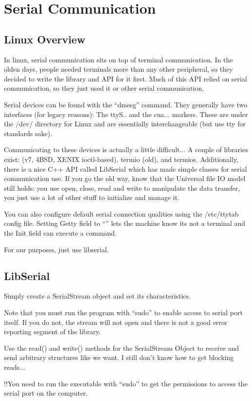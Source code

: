 \documentclass{article}
\begin{document}
\section{Serial Communication}
\subsection*{Linux Overview}
In linux, serial communication sits on top of terminal communication. In the olden days, people needed terminals more than any other peripheral, so they decided to write the library and API for it first. Much of this API relied on serial communication, so they just used it or other serial communication.

Serial devices can be found with the ``dmesg'' command. They generally have two interfaces (for legacy reasons): The ttyS.. and the cua... markers. These are under the /dev/ directory for Linux and are essentially interchangeable (but use tty for standards sake).

Communicating to these devices is actually a little difficult... A couple of libraries exist: (v7, 4BSD, XENIX ioctl-based), termio (old), and termios. Additionally, there is a nice C++ API called LibSerial which has made simple classes for serial communication use. If you go the old way, know that the Universal file IO model still holds: you use open, close, read and write to manipulate the data transfer, you just use a lot of other stuff to initialize and manage it.

You can also configure default serial connection qualities using the /etc/ttytab config file. Setting Getty field to ``'' lets the machine know its not a terminal and the Init field can execute a command.

For our purposes, just use libserial.
\subsection*{LibSerial}
Simply create a SerialStream object and set its characteristics.

Note that you must run the program with ``sudo'' to enable access to serial port itself. If you do not, the stream will not open and there is not a good error reporting segment of the library.

Use the read() and write() methods for the SerialStream Object to receive and send arbitrary structures like we want. I still don't know how to get blocking reads...

!!You need to run the executable with ``sudo'' to get the permissions to access the serial port on the computer.
\end{document}
